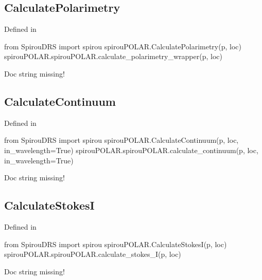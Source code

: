 \noindent\begin{minipage}{\textwidth}
\subsection{CalculatePolarimetry}

Defined in \spirouPOLAR{}

\begin{pythonbox}
from SpirouDRS import spirou
spirouPOLAR.CalculatePolarimetry(p, loc)
spirouPOLAR.spirouPOLAR.calculate_polarimetry_wrapper(p, loc)
\end{pythonbox}

\begin{pythondocstring}
Doc string missing!
\end{pythondocstring}
\end{minipage}



\noindent\begin{minipage}{\textwidth}
\subsection{CalculateContinuum}

Defined in \spirouPOLAR{}

\begin{pythonbox}
from SpirouDRS import spirou
spirouPOLAR.CalculateContinuum(p, loc, in_wavelength=True)
spirouPOLAR.spirouPOLAR.calculate_continuum(p, loc, in_wavelength=True)
\end{pythonbox}

\begin{pythondocstring}
Doc string missing!
\end{pythondocstring}
\end{minipage}



\noindent\begin{minipage}{\textwidth}
\subsection{CalculateStokesI}

Defined in \spirouPOLAR{}

\begin{pythonbox}
from SpirouDRS import spirou
spirouPOLAR.CalculateStokesI(p, loc)
spirouPOLAR.spirouPOLAR.calculate_stokes_I(p, loc)
\end{pythonbox}

\begin{pythondocstring}
Doc string missing!
\end{pythondocstring}
\end{minipage}


